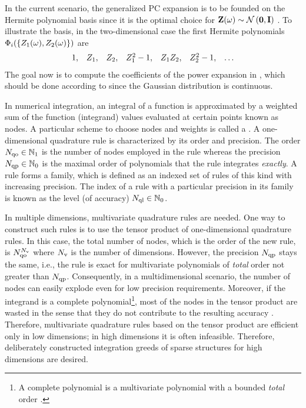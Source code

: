 In the current scenario, the generalized PC expansion is to be founded on the Hermite polynomial basis since it is the optimal choice for $\vZ(\o) \sim \normal{\vZero}{\mI}$ \cite{xiu2002}. To illustrate the basis, in the two-dimensional case the first Hermite polynomials $\Phi_i(\{ Z_1(\omega), Z_2(\omega) \})$ are
\[
  \begin{array}{lllllll}
  1, & Z_1, & Z_2, & Z_1^2 - 1, & Z_1 Z_2, & Z_2^2 - 1, & \dotsc
  \end{array}
\]
The goal now is to compute the coefficients of the power expansion in , which should be done according to  since the Gaussian distribution is continuous.

In numerical integration, an integral of a function is approximated by a weighted sum of the function (integrand) values evaluated at certain points known as nodes. A particular scheme to choose nodes and weights is called a . A one-dimensional quadrature rule is characterized by its order and precision. The order $N_\text{qo} \in \mathbb{N}_{1}$ is the number of nodes employed in the rule whereas the precision $N_\text{qp} \in \mathbb{N}_{0}$ is the maximal order of polynomials that the rule integrates \emph{exactly}. A rule forms a family, which is defined as an indexed set of rules of this kind with increasing precision. The index of a rule with a particular precision in its family is known as the level (of accuracy) $N_\text{ql} \in \mathbb{N}_{0}$.

In multiple dimensions, multivariate quadrature rules are needed. One way to construct such rules is to use the tensor product of one-dimensional quadrature rules. In this case, the total number of nodes, which is the order of the new rule, is $N_\text{qo}^{N_\text{v}}$ where ${N_\text{v}}$ is the number of dimensions. However, the precision $N_\text{qp}$ stays the same, i.e., the rule is exact for multivariate polynomials of \emph{total} order not greater than $N_\text{qp}$. Consequently, in a multidimensional scenario, the number of nodes can easily explode even for low precision requirements. Moreover, if the integrand is a complete polynomial\footnote{A complete polynomial is a multivariate polynomial with a bounded \emph{total} order \cite{heiss2008}.}, most of the nodes in the tensor product are wasted in the sense that they do not contribute to the resulting accuracy \cite{heiss2008}. Therefore, multivariate quadrature rules based on the tensor product are efficient only in low dimensions; in high dimensions it is often infeasible. Therefore, deliberately constructed integration greeds of sparse structures for high dimensions are desired.


